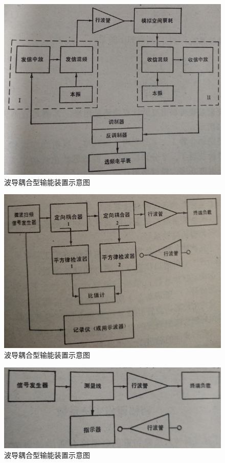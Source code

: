 \begin{figure}[phtb]
	\centering
	\includegraphics[width=0.75\linewidth]{figure/ch11-10}
	\caption{ 波导耦合型输能装置示意图}
	\label{ch11-10}
\end{figure}
\begin{figure}[phtb]
	\centering
	\includegraphics[width=0.75\linewidth]{figure/ch11-11}
	\caption{ 波导耦合型输能装置示意图}
	\label{ch11-11}
\end{figure}
\begin{figure}[phtb]
	\centering
	\includegraphics[width=0.75\linewidth]{figure/ch11-12}
	\caption{ 波导耦合型输能装置示意图}
	\label{ch11-12}
\end{figure}
